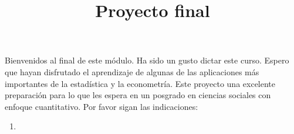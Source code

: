 \documentclass[]{article}
\title{Proyecto final}
\author{Alan Del Rosario \and }
\date{}
\begin{document}
\maketitle

Bienvenidos al final de este módulo. Ha sido un gusto dictar este curso. Espero que hayan disfrutado el aprendizaje de algunas de las aplicaciones más importantes de la estadística y la econometría. Este proyecto una excelente preparación para lo que les espera en un posgrado en ciencias sociales con enfoque cuantitativo.
Por favor sigan las indicaciones:

\begin{enumerate}[label=\alph*.]
	\item 
\end{enumerate}












\section{}
\end{document}
